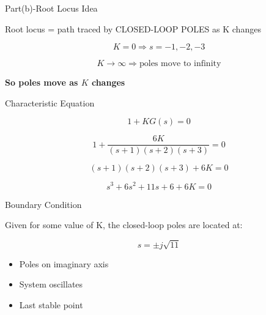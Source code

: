 \documentclass{beamer}
\begin{document}

\begin{frame}{Part(b)-Root Locus Idea}

Root locus = path traced by CLOSED-LOOP POLES as 
K changes

\begin{equation}
K = 0 \Rightarrow s = -1,-2,-3
\end{equation}

\begin{equation}
K \rightarrow \infty \Rightarrow \text{poles move to infinity}
\end{equation}

\textbf{So poles move as $K$ changes}

\end{frame}


\begin{frame}{Characteristic Equation}

\begin{equation}
1 + KG(s) = 0
\end{equation}

\begin{equation}
1 + \frac{6K}{(s+1)(s+2)(s+3)} = 0
\end{equation}

\begin{equation}
(s+1)(s+2)(s+3) + 6K = 0
\end{equation}

\begin{equation}
s^3 + 6s^2 + 11s + 6 + 6K = 0
\end{equation}

\end{frame}


\begin{frame}{Boundary Condition}

Given
for some value of 
K, the closed-loop poles are located at:

\begin{equation}
s = \pm j\sqrt{11}
\end{equation}

\begin{itemize}
    \item Poles on imaginary axis
    \item System oscillates
    \item Last stable point
\end{itemize}

\end{frame}
\end{document}
